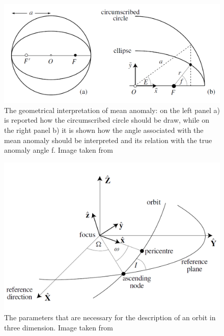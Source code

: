 \documentclass[12pt,%
               a4paper,%
               oneside,openany,%
               titlepage,%
               headinclude,footinclude,%
               BCOR5mm,%
               cleardoublepage=empty,%
               tablecaptionabove,%
               floatperchapter,
               ]{scrreprt}                 %
\begin{document}
\begin{figure}[h]
\begin{center}
\includegraphics[width=1\textwidth]{Figures/Mean_anomaly.png}
\caption{The geometrical interpretation of mean anomaly: on the left panel a) is reported how the circumscribed circle should be draw, while on the right panel b) it is shown how the angle associated with the mean anomaly should be interpreted and its relation with the true anomaly angle f. Image taken from \cite{murray1999solar}}
\label{Mean_anomaly}
\end{center}
\end{figure}

\begin{figure}[h]
\begin{center}
\includegraphics[width=1\textwidth]{Figures/Inclination.png}
\caption{The parameters that are necessary for the description of an orbit in three dimension. Image taken from \cite{murray1999solar}}
\label{Inclination}
\end{center}
\end{figure}
\end{document}

